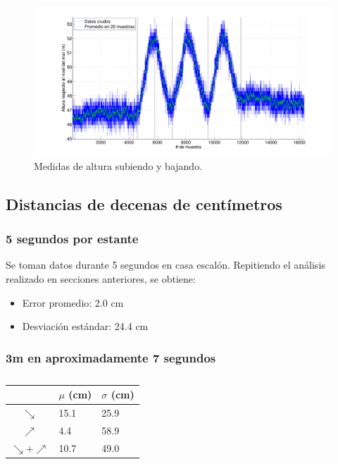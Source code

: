 \documentclass[main]{subfiles}
\begin{document}
\begin{figure}[H]
\hspace{-50pt}
  \includegraphics[width=1.2\textwidth]{./pics_barom/variando.pdf}
\vspace{-20pt}
  \caption{Medidas de altura subiendo y bajando.}
\vspace{-10pt}
  \label{fig:variando}
\end{figure}

\subsection{Distancias de decenas de cent\'imetros}

\subsubsection{5 segundos por estante}

Se toman datos durante 5 segundos en casa escal\'on. Repitiendo el an\'alisis realizado en secciones anteriores, se obtiene:
\begin{itemize}
\item Error promedio: 2.0 cm
\item Desviaci\'on est\'andar: 24.4 cm
\end{itemize}

\subsubsection{3m en aproximadamente 7 segundos}

\begin{table}
\vspace{-105pt}
\hspace{10pt}
\begin{tabular}{c|p{40pt}|p{40pt}|} 
\cline{2-3}
  & $\mu$ (cm) & $\sigma$ (cm)\\ \hline
\multicolumn{1}{|c|}{$\searrow$} & 15.1 & 25.9 \\ \hline
\multicolumn{1}{|c|}{$\nearrow$} & 4.4 &  58.9 \\ \hline
\multicolumn{1}{|c|}{$\searrow$+$\nearrow$} & 10.7 & 49.0 \\ \hline
\end{tabular}
\caption{}
\label{tab:ruido-rms}
\vspace{-15pt}
\end{table}
\end{document}
